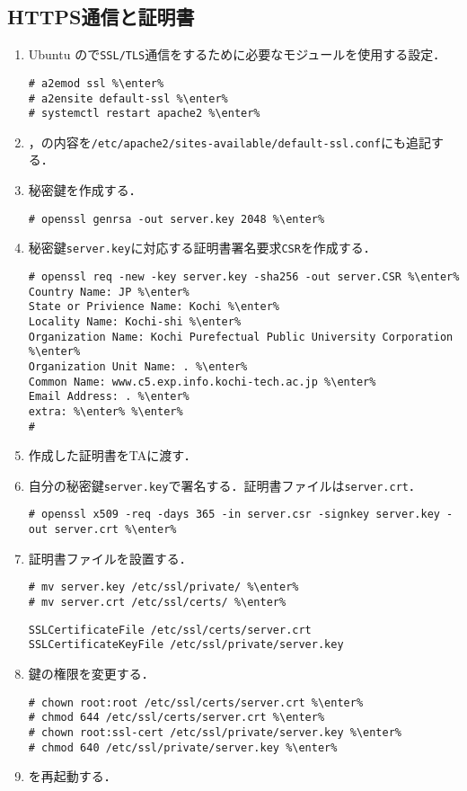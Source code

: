 \documentclass{jlreq}
\begin{document}
\subsection{HTTPS通信と証明書}
\begin{enumerate}
    \item Ubuntu の\apache で\texttt{SSL/TLS}通信をするために必要なモジュールを使用する設定．
          \begin{lstlisting}
# a2emod ssl %\enter%
# a2ensite default-ssl %\enter%
# systemctl restart apache2 %\enter%
\end{lstlisting}
    \item {}，の内容を\texttt{/etc/apache2/sites-available/default-ssl.conf}にも追記する．
    \item 秘密鍵を作成する．
          \begin{lstlisting}
# openssl genrsa -out server.key 2048 %\enter%
\end{lstlisting}
    \item 秘密鍵\texttt{server.key}に対応する証明書署名要求\texttt{CSR}を作成する．
          \begin{lstlisting}
# openssl req -new -key server.key -sha256 -out server.CSR %\enter%
Country Name: JP %\enter%
State or Privience Name: Kochi %\enter%
Locality Name: Kochi-shi %\enter%
Organization Name: Kochi Purefectual Public University Corporation %\enter%
Organization Unit Name: . %\enter%
Common Name: www.c5.exp.info.kochi-tech.ac.jp %\enter%
Email Address: . %\enter%
extra: %\enter% %\enter%
# 
\end{lstlisting}
    \item 作成した証明書をTAに渡す．
    \item 自分の秘密鍵\texttt{server.key}で署名する．証明書ファイルは\texttt{server.crt}．
          \begin{lstlisting}
# openssl x509 -req -days 365 -in server.csr -signkey server.key -out server.crt %\enter%
\end{lstlisting}
    \item 証明書ファイルを設置する．
          \begin{lstlisting}
# mv server.key /etc/ssl/private/ %\enter%
# mv server.crt /etc/ssl/certs/ %\enter%
\end{lstlisting}
          \begin{lstlisting}[style=file,caption={\ttfamily /etc/apache2/sites-available/default-ssl.conf}]
SSLCertificateFile /etc/ssl/certs/server.crt
SSLCertificateKeyFile /etc/ssl/private/server.key
\end{lstlisting}
    \item 鍵の権限を変更する．
          \begin{lstlisting}
# chown root:root /etc/ssl/certs/server.crt %\enter%
# chmod 644 /etc/ssl/certs/server.crt %\enter%
# chown root:ssl-cert /etc/ssl/private/server.key %\enter%
# chmod 640 /etc/ssl/private/server.key %\enter%
\end{lstlisting}
    \item \apache を再起動する．
\end{enumerate}
\end{document}
